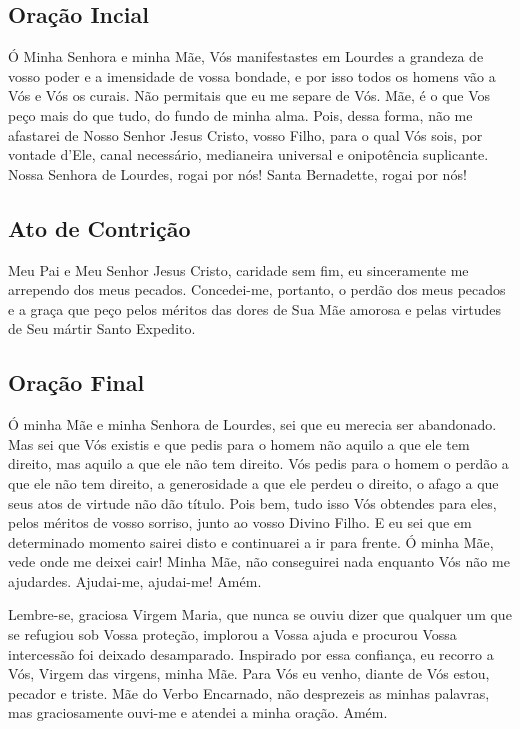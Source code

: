 \documentclass[18pt]{article}
\begin{document}
\begin{justify}
\subsection{Oração Incial}\label{sec:Oração_Inicial} %

Ó Minha Senhora e minha Mãe, Vós manifestastes em Lourdes a grandeza de vosso poder e a imensidade de vossa bondade, e por isso todos os homens vão a Vós e Vós os curais. Não permitais que eu me separe de Vós. Mãe, é o que Vos peço mais do que tudo, do fundo de minha alma. Pois, dessa forma, não me afastarei de Nosso Senhor Jesus Cristo, vosso Filho, para o qual Vós sois, por vontade d’Ele, canal necessário, medianeira universal e onipotência suplicante. Nossa Senhora de Lourdes, rogai por nós! Santa Bernadette, rogai por nós!


\subsection{Ato de Contrição}\label{sec:Ato_de_Contrição} %

Meu Pai e Meu Senhor Jesus Cristo, caridade sem fim, eu sinceramente me arrependo dos meus pecados. Concedei-me, portanto, o perdão dos meus pecados e a graça que peço pelos méritos das dores de Sua Mãe amorosa e pelas virtudes de Seu mártir Santo Expedito.


\subsection{Oração Final}\label{sec:Oração_Final} %


Ó minha Mãe e minha Senhora de Lourdes, sei que eu merecia ser abandonado. Mas sei que Vós existis e que pedis para o homem não aquilo a que ele tem direito, mas aquilo a que ele não tem direito. Vós pedis para o homem o perdão a que ele não tem direito, a generosidade a que ele perdeu o direito, o afago a que seus atos de virtude não dão título. Pois bem, tudo isso Vós obtendes para eles, pelos méritos de vosso sorriso, junto ao vosso Divino Filho. E eu sei que em determinado momento sairei disto e continuarei a ir para frente. Ó minha Mãe, vede onde me deixei cair! Minha Mãe, não conseguirei nada enquanto Vós não me ajudardes. Ajudai-me, ajudai-me! Amém.

Lembre-se, graciosa Virgem Maria, que nunca se ouviu dizer que qualquer um que se refugiou sob Vossa proteção, implorou a Vossa ajuda e procurou Vossa intercessão foi deixado desamparado. Inspirado por essa confiança, eu recorro a Vós, Virgem das virgens, minha Mãe. Para Vós eu venho, diante de Vós estou, pecador e triste. Mãe do Verbo Encarnado, não desprezeis as minhas palavras, mas graciosamente ouvi-me e atendei a minha oração. Amém.


\end{justify}
\end{document}
